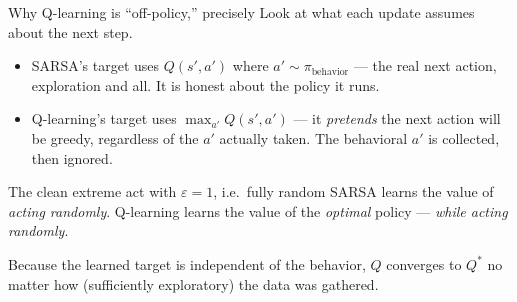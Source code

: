 \documentclass[10pt, aspectratio=169]{beamer}
\begin{document}
\begin{frame}{Why Q-learning is ``off-policy,'' precisely}
Look at what each update assumes about the next step.
\medskip
\begin{itemize}\setlength\itemsep{3pt}
\item SARSA's target uses $Q(s',a')$ where $a' \sim \pi_{\text{behavior}}$ --- the \alert{real} next action, exploration and all. It is honest about the policy it runs.
\item Q-learning's target uses $\max_{a'} Q(s',a')$ --- it \emph{pretends} the next action will be greedy, regardless of the $a'$ actually taken. The behavioral $a'$ is collected, then \alert{ignored}.
\end{itemize}
\medskip

\pause
\begin{block}{The clean extreme \hfill {\scriptsize\normalfont act with $\varepsilon=1$, i.e.\ fully random}}
\centering
SARSA learns the value of \emph{acting randomly}. \quad Q-learning learns the value of the \emph{optimal} policy --- \emph{while acting randomly}.
\end{block}
\medskip
Because the learned target is independent of the behavior, $Q$ converges to $Q^*$ no matter how (sufficiently exploratory) the data was gathered.
\end{frame}
\end{document}
